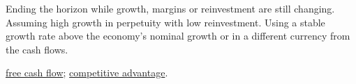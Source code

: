 \begin{qfmethod}
 Ending the horizon while growth, margins or reinvestment are still changing. Assuming high growth in perpetuity with low reinvestment. Using a stable growth rate above the economy's nominal growth or in a different currency from the cash flows.

 \hyperref[meth:free-cash-flow-coverage]{free cash flow}; \hyperref[meth:competition-inflation-forecasting]{competitive advantage}.

\end{qfmethod}
